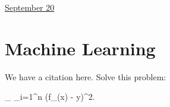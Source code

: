 \documentclass[11pt,letterpaper]{article}
\begin{document}
\href{run:2025-09-20-newmethod.tex}{\Huge September 20} 

\section{Machine Learning}

We have a citation \cite{research_methods2024} here.  Solve this problem: 

\bb 
\min_{\theta} \sum_{i=1}^n (f_\theta(x\datai) - y\datai)^2. 
\ee 

 

\end{document}
